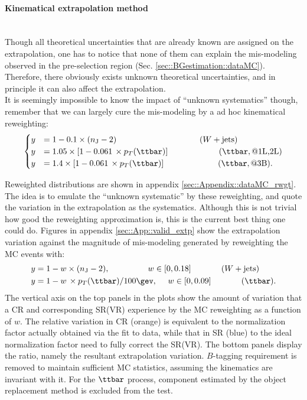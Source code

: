 \paragraph{Kinematical extrapolation method} \mbox{} \\
Though all theoretical uncertainties that are already known are assigned on the extrapolation, one has to notice that none of them can explain the mis-modeling observed in the pre-selection region (Sec. \ref{sec::BGestimation::dataMC}). Therefore, there obviously exists unknown theoretical uncertainties, and in principle it can also affect the extrapolation. \\

It is seemingly impossible to know the impact of ``unknown systematics'' though, remember that we can largely cure the mis-modeling by a ad hoc kinematical reweighting:
\begin{align}                                                                                 
\begin{cases}
y & = 1 - 0.1 \times (\nJetNoGev-2) \mbox{\phantom{MMMMMMMMMMM}} (\wjets) \nn \\
y & = 1.05 \times \left[ 1 - 0.061 \,\times p_T(\ttbar) \right] \mbox{\phantom{MMMMMMk}} (\ttbar, \mbox{@1L,2L}) \nn \\
y & = 1.4 \times \left[ 1 - 0.061 \,\times p_T(\ttbar) \right] \mbox{\phantom{MMMMMMM}} (\ttbar, \mbox{@3B}).
\end{cases}
\end{align} 

Reweighted distributions are shown in appendix \ref{sec::Appendix::dataMC_rwgt}. 
The idea is to emulate the ``unknown systematic'' by these reweighting, and quote the variation in the extrapolation as the systematics. 
Although this is not trivial how good the reweighting approximation is, this is the current best thing one could do.
%
Figures in appendix \ref{sec::App::valid_extp} show the extrapolation variation against the magnitude of mis-modeling generated by reweighting the MC events with:
\begin{align}
 y & = 1 - w \times (\nJetNoGev-2), \mbox{\phantom{MMMM}}\,\,\,\,\,\, w \in [0,0.18]  \mbox{\phantom{MMMM}} (\wjets) \nn  \\
 y & = 1 - w \,\times p_T(\ttbar)/100\gev, \,\,\,\,\,\,\,\,           w \in [0,0.09]  \mbox{\phantom{MMMM}} (\ttbar).
\label{eq::BGestimation::injected_MCvariation}
\end{align}
The vertical axis on the top panels in the plots show the amount of variation that a CR and corresponding SR(VR) experience by the MC reweighting as a function of $w$. 
The relative variation in CR (orange) is equivalent to the normalization factor actually obtained via the fit to data, 
while that in SR (blue) to the ideal normalization factor need to fully correct the SR(VR). 
%
The bottom panels display the ratio, namely the resultant extrapolation variation. 
$B$-tagging requirement is removed to maintain sufficient MC statistics, assuming the kinematics are invariant with it. 
For the $\ttbar$ process, component estimated by the object replacement method is excluded from the test. \\

